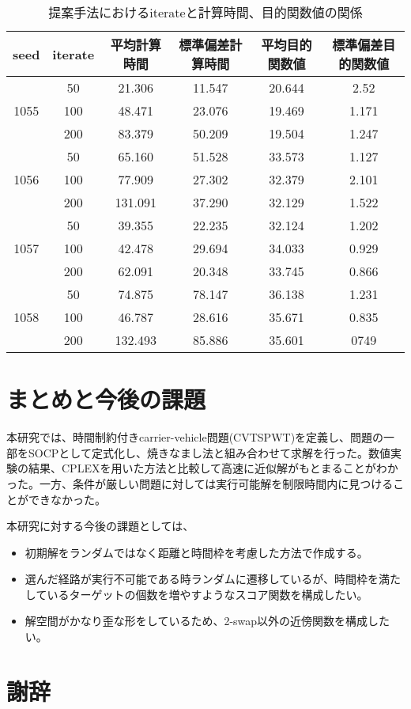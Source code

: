 \documentclass[11pt,a4paper,dvipdfmx,titlepage,uplatex]{jsarticle}
\theoremstyle{mystyle}
\newcommand{\0}{\mathbf{0}}
\begin{document}
	\begin{table}[htb]
		\centering
		\caption{提案手法におけるiterateと計算時間、目的関数値の関係}
		\begin{tabular}{|c c|c c c c |} \hline
			seed & iterate & 平均計算時間&標準偏差計算時間&平均目的関数値&標準偏差目的関数値 \\ \hline
			\multirow{3}{*}{1055}
			& 50  & 21.306 &11.547  &20.644  &2.52  \\
			& 100 & 48.471 & 23.076 & 19.469 & 1.171 \\
			& 200 & 83.379 & 50.209 & 19.504 & 1.247\\ \hline
			\multirow{3}{*}{1056}
			& 50  & 65.160 & 51.528 & 33.573 &1.127\\
			& 100 & 77.909& 27.302 & 32.379 & 2.101\\
			& 200 & 131.091& 37.290& 32.129& 1.522\\ \hline
			\multirow{3}{*}{1057}
			& 50  & 39.355&22.235 &32.124 &1.202\\
			& 100 & 42.478& 29.694&34.033 & 0.929\\
			& 200 &62.091 & 20.348& 33.745&0.866 \\ \hline
			\multirow{3}{*}{1058}
			& 50  & 74.875&78.147 & 36.138&1.231\\
			& 100 & 46.787& 28.616& 35.671&0.835 \\
			& 200 & 132.493& 85.886&35.601 & 0749\\ \hline
		\end{tabular}
		\label{tab:relation_time_with_score}
	\end{table}
	
	\clearpage
	\section{まとめと今後の課題}\label{sec:Conclusion}
	本研究では、時間制約付きcarrier-vehicle問題(CVTSPWT)を定義し、問題の一部をSOCPとして定式化し、焼きなまし法と組み合わせて求解を行った。数値実験の結果、CPLEXを用いた方法と比較して高速に近似解がもとまることがわかった。一方、条件が厳しい問題に対しては実行可能解を制限時間内に見つけることができなかった。
	
	本研究に対する今後の課題としては、
	\begin{itemize}
		\item 初期解をランダムではなく距離と時間枠を考慮した方法で作成する。
		\item 選んだ経路が実行不可能である時ランダムに遷移しているが、時間枠を満たしているターゲットの個数を増やすようなスコア関数を構成したい。
		\item 解空間がかなり歪な形をしているため、2-swap以外の近傍関数を構成したい。
	\end{itemize}
	\clearpage
	\section*{謝辞}\label{sec:Acknowledgement}
	
	
	\clearpage
	\begin{small}
		
		    
	\end{small}
	
	
\end{document}
